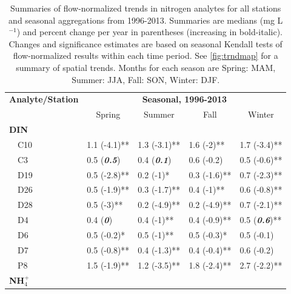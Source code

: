 \documentclass[journal = esthag, manuscript = article]{achemso}\usepackage[]{graphicx}\usepackage[]{color}
\begin{document}
\begin{table}[!tbp]
\caption{Summaries of flow-normalized trends in nitrogen analytes for all stations and seasonal aggregations from 1996-2013. Summaries are  medians (mg L$^{-1}$) and percent change per year in parentheses (increasing in bold-italic). Changes and significance estimates are based on seasonal Kendall tests of flow-normalized results within each time period. See \cref{fig:trndmap} for a summary of spatial trends. Months for each season are Spring: MAM, Summer: JJA, Fall: SON, Winter: DJF.\label{tab:trndsaft}} 
\begin{center}
\begin{tabular}{lllll}
\hline\hline
\multicolumn{1}{l}{\bfseries Analyte/Station}&\multicolumn{4}{c}{\bfseries Seasonal, 1996-2013}\tabularnewline
\cline{2-5}
\multicolumn{1}{l}{}&\multicolumn{1}{c}{Spring}&\multicolumn{1}{c}{Summer}&\multicolumn{1}{c}{Fall}&\multicolumn{1}{c}{Winter}\tabularnewline
\hline
{\bfseries DIN}&&&&\tabularnewline
~~C10&1.1 \footnotesize{(-4.1)**}&1.3 \footnotesize{(-3.1)**}&1.6 \footnotesize{(-2)**}&1.7 \footnotesize{(-3.4)**}\tabularnewline
~~C3&0.5 \footnotesize{(\textit{\textbf{0.5}})}&0.4 \footnotesize{(\textit{\textbf{0.1}})}&0.6 \footnotesize{(-0.2)}&0.5 \footnotesize{(-0.6)**}\tabularnewline
~~D19&0.5 \footnotesize{(-2.8)**}&0.2 \footnotesize{(-1)*}&0.3 \footnotesize{(-1.6)**}&0.7 \footnotesize{(-2.3)**}\tabularnewline
~~D26&0.5 \footnotesize{(-1.9)**}&0.3 \footnotesize{(-1.7)**}&0.4 \footnotesize{(-1)**}&0.6 \footnotesize{(-0.8)**}\tabularnewline
~~D28&0.5 \footnotesize{(-3)**}&0.2 \footnotesize{(-4.9)**}&0.2 \footnotesize{(-4.9)**}&0.7 \footnotesize{(-2.1)**}\tabularnewline
~~D4&0.4 \footnotesize{(\textit{\textbf{0}})}&0.4 \footnotesize{(-1)**}&0.4 \footnotesize{(-0.9)**}&0.5 \footnotesize{(\textit{\textbf{0.6}})**}\tabularnewline
~~D6&0.5 \footnotesize{(-0.2)*}&0.5 \footnotesize{(-1)**}&0.5 \footnotesize{(-0.3)*}&0.5 \footnotesize{(-0.1)}\tabularnewline
~~D7&0.5 \footnotesize{(-0.8)**}&0.4 \footnotesize{(-1.3)**}&0.4 \footnotesize{(-0.4)**}&0.6 \footnotesize{(-0.2)}\tabularnewline
~~P8&1.5 \footnotesize{(-1.9)**}&1.2 \footnotesize{(-3.5)**}&1.8 \footnotesize{(-2.4)**}&2.7 \footnotesize{(-2.2)**}\tabularnewline
\hline
{\bfseries NH$_{4}^{+}$}&&&&\tabularnewline

\end{tabular}
\end{center}
\end{table}
\end{document}
